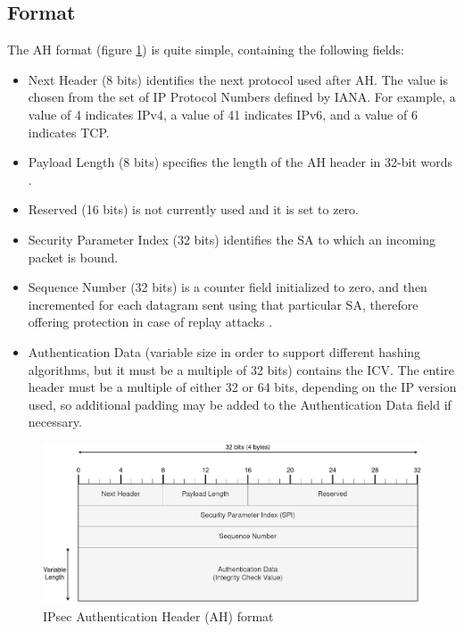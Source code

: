\documentclass[a4paper,12pt]{report}
\begin{document}
		\subsection{Format}
		The AH format (figure \ref{ah_header}) is quite simple, containing the following fields:
	\begin{itemize}
	\item Next Header (8 bits) identifies the next protocol used after AH. The value is chosen from the set of IP Protocol Numbers defined by IANA. For example, a value of 4 indicates IPv4, a value of 41 indicates IPv6, and a value of 6 indicates TCP.
	\item Payload Length (8 bits) specifies the length of the AH header in 32-bit words \cite{rfc4302}.
	\item Reserved (16 bits) is not currently used and it is set to zero. 
	\item Security Parameter Index (32 bits) identifies the SA to which an incoming packet is bound.
	\item Sequence Number (32 bits) is a counter field initialized to zero, and then incremented for each datagram sent using that particular SA, therefore offering protection in case of replay attacks \cite{kozierok2005tcp}.
	\item Authentication Data (variable size in order to support different hashing algorithms, but it must be a multiple of 32 bits) contains the ICV. The entire header must be a multiple of either 32 or 64 bits, depending on the IP version used, so additional padding may be added to the Authentication Data field if necessary.
\end{itemize}			
		
		\begin{figure}[h]
			\includegraphics[width=\textwidth]{ah_header}
			\centering
			\caption{IPsec Authentication Header (AH) format}
			\label{ah_header}
		\end{figure}
		
		\newpage
\end{document}
